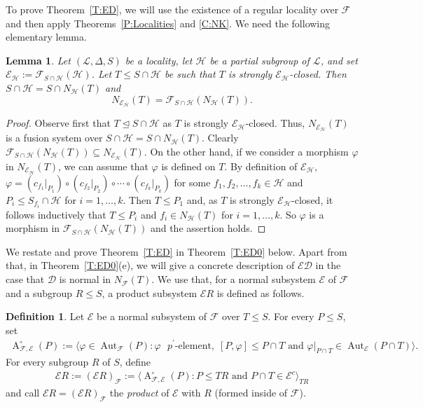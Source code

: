 \documentclass[reqno,11pt]{amsart}
\numberwithin{equation}{section}
\newtheorem{lemma}[theorem]{Lemma}
\theoremstyle{definition}
\newtheorem{definition}[theorem]{Definition}
\newcommand{\F}{\mathcal{F}}
\newcommand{\E}{\mathcal{E}}
\renewcommand{\L}{\mathcal{L}}
\renewcommand{\H}{\mathcal{H}}
\newcommand{\Aut}{\operatorname{Aut}}
\newcommand{\Ac}{\operatorname{A}^\circ}
\newcommand{\mD}{\mathcal{D}}
\def \<{\langle }
\def \>{\rangle }
\renewcommand{\phi}{\varphi}
\begin{document}
To prove Theorem~\ref{T:ED}, we will use the existence of a regular locality over $\F$ and then apply Theorems~\ref{P:Localities} and \ref{C:NK}. We need the following elementary lemma.

\begin{lemma}\label{L:NET}
Let $(\L,\Delta,S)$ be a locality, let $\H$ be a partial subgroup of $\L$, and set $\E_\H:=\F_{S\cap\H}(\H)$. Let $T\leq S\cap\H$ be such that $T$ is strongly $\E_\H$-closed. Then $S\cap\H=S\cap N_\H(T)$ and
\[N_{\E_\H}(T)=\F_{S\cap \H}(N_\H(T)).\]
\end{lemma}

\begin{proof}
Observe first that $T\unlhd S\cap\H$ as $T$ is strongly $\E_\H$-closed. Thus, $N_{\E_\H}(T)$ is a fusion system over $S\cap\H=S\cap N_\H(T)$. Clearly $\F_{S\cap\H}(N_\H(T))\subseteq N_{\E_\H}(T)$. On the other hand, if we consider a morphism $\phi$ in $N_{\E_\H}(T)$, we can assume that $\phi$ is defined on $T$. By definition of $\E_\H$, $\phi=(c_{f_1}|_{P_1})\circ (c_{f_2}|_{P_2})\circ\cdots\circ (c_{f_k}|_{P_k})$ for some $f_1,f_2,\dots,f_k\in\H$ and $P_i\leq S_{f_i}\cap\H$ for $i=1,\dots,k$. Then $T\leq P_1$ and, as $T$ is strongly $\E_\H$-closed, it follows inductively that $T\leq P_i$ and $f_i\in N_\H(T)$ for $i=1,\dots,k$. So $\phi$ is a morphism in $\F_{S\cap\H}(N_\H(T))$ and the assertion holds.
\end{proof}

We restate and prove Theorem~\ref{T:ED} in Theorem~\ref{T:ED0} below. Apart from that, in Theorem~\ref{T:ED0}(e), we will give a concrete description of $\E\mD$ in the case that $\mD$ is normal in $N_\F(T)$. We use that, for a normal subsystem $\E$ of $\F$ and a subgroup $R\leq S$, a product subsystem $\E R$ is defined as follows.

\begin{definition}\label{D:Product}
Let $\E$ be a normal subsystem of $\F$ over $T\leq S$. For every $P\leq S$, set
\begin{eqnarray*}
\Ac_{\F,\E}(P):=\<\phi\in\Aut_\F(P)\colon \phi\mbox{ $p^\prime$-element},\;[P,\phi]\leq P\cap T\mbox{ and }\phi|_{P\cap T}\in\Aut_\E(P\cap T)\>.
\end{eqnarray*}
For every subgroup $R$ of $S$, define
\begin{eqnarray*}
\E R:=(\E R)_\F:=\<\Ac_{\F,\E}(P)\colon P\leq TR\mbox{ and }P\cap T\in\E^c\>_{TR}
\end{eqnarray*}
and call $\E R=(\E R)_\F$ the \emph{product} of $\E$ with $R$ (formed inside of $\F$).
\end{definition}
\end{document}
